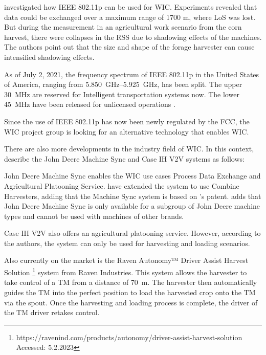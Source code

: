 \textcite{klingler_agriculture_2018} investigated how IEEE 802.11p can be used for \ac{WIC}. Experiments revealed
that data could be exchanged over a maximum range of 1700 m, where \ac{LoS} was lost. But during the
measurement in an agricultural work scenario from the corn harvest, there were collapses in the \ac{RSS}
due to shadowing effects of the machines. The authors point out that the size and shape of the forage harvester
can cause intensified shadowing effects.

As of July 2, 2021, the frequency spectrum of IEEE 802.11p in the United States of America, ranging from
\SIrange{5,850}{5,925}{\giga\hertz}, has been split. The upper \SI{30}{\mega\hertz} are reserved for
Intelligent transportation systems now. The lower \SI{45}{\mega\hertz} have been released for unlicensed
operations \cite{noauthor_use_2021}.

Since the use of IEEE 802.11p has now been newly
regulated by the FCC, the \ac{WIC} project group is looking for an alternative technology that enables \ac{WIC}.

There are also more developments in the industry field of \ac{WIC}. In this context, \textcite{thomasson_review_2018} describe the John Deere Machine Sync and Case IH V2V systems as follows:

John Deere Machine Sync enables the \ac{WIC} use cases Process Data Exchange and Agricultural Platooning Service. \textcite{liu_automation_2022} have extended the system to use Combine Harvesters, adding that the Machine Sync system is based on \textcite{metzler_system_2006}'s patent.
\textcite{smolnik_5g_2020} adds that John Deere Machine Sync is only available for a subgroup of John Deere machine types and cannot be used with machines of other brands.

Case IH V2V also offers an agricultural platooning service. However, according to the authors, the system can only be used for harvesting and loading scenarios.

Also currently on the market is the Raven Autonomy™ Driver Assist Harvest Solution \footnote{https://ravenind.com/products/autonomy/driver-assist-harvest-solution Accessed: 5.2.2023} system from Raven Industries. This system allows the harvester to take control of a \ac{TM} from a distance of \SI{70}{\metre}. The harvester then automatically guides the \ac{TM} into the perfect position to load the harvested crop onto the \ac{TM} via the spout. Once the harvesting and loading process is complete, the driver of the \ac{TM} driver retakes control.

